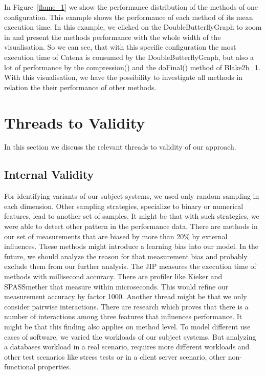 In Figure~\ref{flame_1} we show the performance distribution of the methods of one configuration. This example shows the performance of each method of its mean execution time. In this example, we clicked on the DoubleButterflyGraph to zoom in and present the methods performance with the whole width of the visualisation. So we can see, that with this specific configuration the most execution time of Catena is consumed by the DoubleButterflyGraph, but also a lot of performance by the compression() and the doFinal() method of Blake2b\_1. With this visualisation, we have the possibility to investigate all methods in relation the their performance of other methods. 





\section{Threads to Validity}
\label{validity}

In this section we discuss the relevant threads to validity of our approach.


\subsection{Internal Validity}



For identifying variants of our subject systems, we used only random sampling in each dimension. Other sampling strategies, specialize to binary or numerical features, lead to another set of samples. It might be that with such strategies, we were able to detect other pattern in the performance data. There are methods in our set of measurements that are biased by more than 20\% by external influences. These methods might introduce a learning bias into our model. In the future, we should analyze the reason for that measurement bias and probably exclude them from our further analysis. The \ac{JIP} measures the execution time of methods with millisecond accuracy. There are profiler like Kieker and SPASSmether that measure within microseconds. This would refine our measurement accuracy by factor 1000. Another thread might be that we only consider pairwise interactions. There are research which proves that there is a number of interactions among three features that influences performance. It might be that this finding also applies on method level. To model different use cases of software, we varied the workloads of our subject systems. But analyzing a databases workload in a real scenario, requires more different workloads and other test scenarios like stress tests or in a client server scenario, other non-functional properties.


